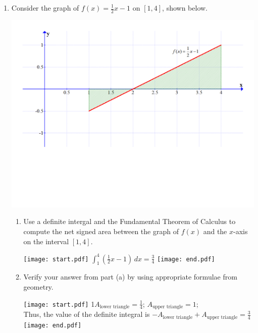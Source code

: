 \documentclass[12pt]{article}
\begin{document}
\begin{enumerate}

\item Consider the graph of $f(x)=\frac{1}{2}x-1$ on $[1,4]$, shown below.

\begin{center}

\includegraphics[scale=0.45]{area.pdf}

\end{center}

\begin{enumerate}

\item Use a definite intergal and the Fundamental Theorem of Calculus to compute the net signed area between the graph of $f(x)$ and the $x$-axis on the interval $[1,4]$.

\texttt{[image: start.pdf]}
{{$\int_1^4{\left(\frac{1}{2}x-1\right)}\,dx=\frac{3}{4}$}}
\texttt{[image: end.pdf]}


\item Verify your answer from part (a) by using appropriate formulae from geometry.

\texttt{[image: start.pdf]}
{{{1\linewidth}{$A_{\text{lower triangle}}=\frac{1}{4}$; $A_{\text{upper triangle}}=1$;\\
 Thus, the value of the definite integral is $-A_{\text{lower triangle}}+A_{\text{upper triangle}}=\frac{3}{4}$}}}
\texttt{[image: end.pdf]}


\end{enumerate}

\end{enumerate}
\end{document}

